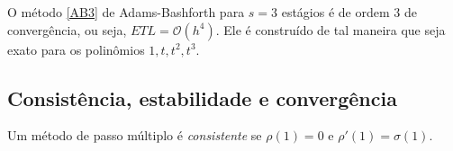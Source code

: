 %
%
%
%
%

\begin{ex}
O método \eqref{AB3} de Adams-Bashforth para $s=3$ estágios é de ordem $3$ de convergência, ou seja, $ETL = \mathcal O(h^4)$. Ele é construído de tal maneira que seja exato para os polinômios $1, t, t^2, t^3$.
\end{ex}


\subsection{Consistência, estabilidade e convergência}
\begin{teo}
Um método de passo múltiplo é \emph{consistente} se $\rho (1)=0$ e $\rho '(1)=\sigma (1)$.
\end{teo}


